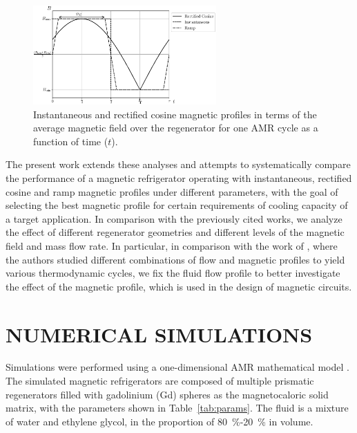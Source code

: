 \documentclass[draft]{svjour3}
\begin{document}
\begin{figure}[!ht]
  \centering
  \includegraphics[width=7cm]{profiles_all.eps}
  \caption{Instantaneous and rectified cosine magnetic profiles in terms of the average magnetic field over the regenerator for one AMR cycle as a function of time ($t$). }
  \label{fig:cycles}
\end{figure}


The present work extends these analyses and attempts to systematically compare the performance of a magnetic refrigerator operating with instantaneous, rectified cosine and ramp magnetic  profiles under different parameters, with the goal of selecting the best magnetic profile for certain requirements of cooling capacity of a target application. In comparison with the previously cited works, we analyze the effect of different regenerator geometries and different levels of the magnetic field and mass flow rate. In particular, in comparison with the work of \cite{bib:kitanovski}, where the authors studied different combinations of flow and magnetic profiles to yield various thermodynamic cycles, we fix the fluid flow profile to better investigate the effect of the magnetic profile, which is used in the design of magnetic circuits.

\section{NUMERICAL SIMULATIONS}
\label{sec:numer-simul}

Simulations were performed using a one-dimensional AMR mathematical model \cite{bib:asme-mce,bib:trevizoli16_perfor_model}. The simulated magnetic refrigerators are composed of multiple prismatic regenerators filled with gadolinium (Gd) spheres as the magnetocaloric solid matrix, with the parameters shown in Table~\ref{tab:params}. The fluid is a mixture of water and ethylene glycol, in the proportion of \SI{80}{\percent}-\SI{20}{\percent} in volume.
\end{document}
